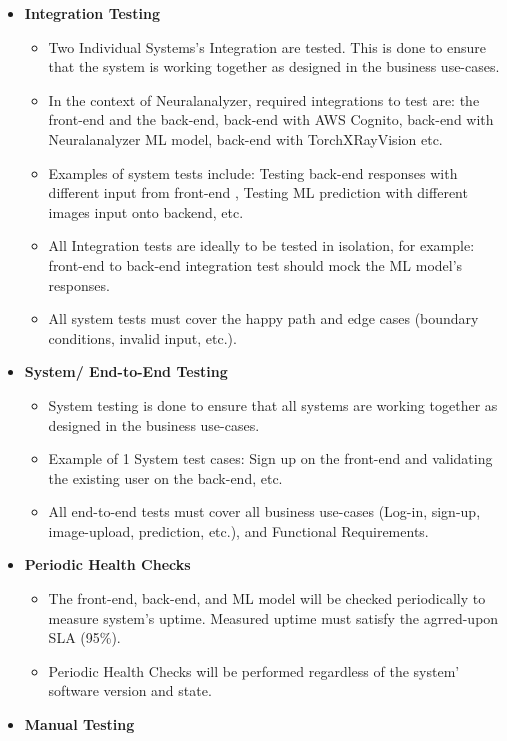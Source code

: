 \documentclass[12pt, titlepage]{article}
\begin{document}
\begin{itemize}
  \item{\textbf{Integration Testing}}
  \begin{itemize}
    \item{Two Individual Systems's Integration are tested. This is done to ensure that the system is working together as designed in the business use-cases.}
    \item{In the context of Neuralanalyzer, required integrations to test are: the front-end and the back-end, back-end with AWS Cognito, back-end with Neuralanalyzer ML model, back-end with TorchXRayVision etc.}
    \item{Examples of system tests include: Testing back-end responses with different input from front-end , Testing ML prediction with different images input onto backend, etc.}
    \item{All Integration tests are ideally to be tested in isolation, for example: front-end to back-end integration test should mock the ML model's responses.}
    \item{All system tests must cover the happy path and edge cases (boundary conditions, invalid input, etc.).}
  \end{itemize}
  \item{\textbf{System/ End-to-End Testing}}
  \begin{itemize}
    \item{System testing is done to ensure that all systems are working together as designed in the business use-cases.}
    \item{Example of 1 System test cases: Sign up on the front-end and validating the existing user on the back-end, etc.}
    \item{All end-to-end tests must cover all business use-cases (Log-in, sign-up, image-upload, prediction, etc.), and Functional Requirements.}
  \end{itemize}
  \item{\textbf{Periodic Health Checks}}
  \begin{itemize}
    \item{The front-end, back-end, and ML model will be checked periodically to measure system's uptime. Measured uptime must satisfy the agrred-upon SLA (95\%).}
    \item{Periodic Health Checks will be performed regardless of the system' software version and state.}
  \end{itemize}
  \item{\textbf{Manual Testing}}
  \begin{itemize}

\end{itemize}
\end{itemize}
\end{document}
